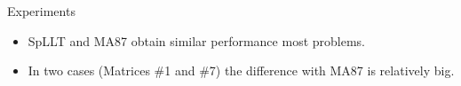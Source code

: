 \documentclass[unknownkeysallowed]{beamer}
\newcommand{\dr}[1]{\textcolor{mred}{#1\xspace}}
\newcommand{\dd}[1]{\textcolor{gray!70}{#1\xspace}}
\begin{document}
\begin{frame}{Experiments}
\begin{center}
  \end{center}
  
  \begin{itemize}
  \item SpLLT and MA87 obtain similar performance most problems.
  \item In two cases (Matrices \#1 and \#7) the difference with MA87
    is relatively big.
  \end{itemize}
\end{frame}
\end{document}
